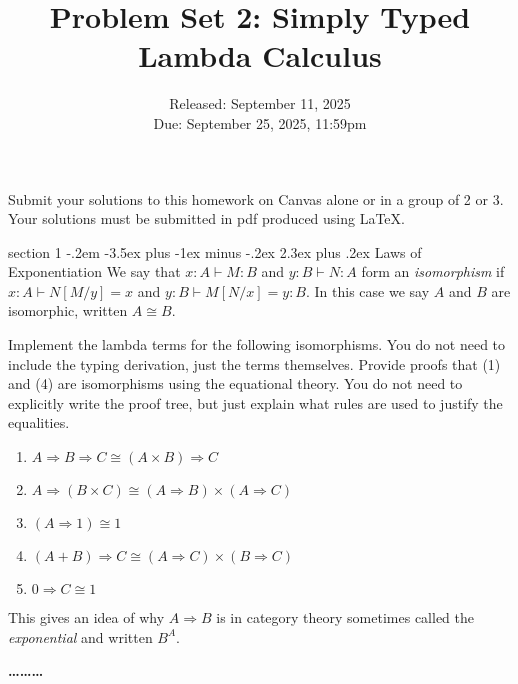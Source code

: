\documentclass[12pt]{article}
\makeatletter
\newenvironment{problem}{\@startsection
       {section}
       {1}
       {-.2em}
       {-3.5ex plus -1ex minus -.2ex}
       {2.3ex plus .2ex}
       {\pagebreak[3]%
       \large\bf\noindent{Problem }
       }
       }
       {%
       \begin{center}\large\bf \ldots\ldots\ldots\end{center}}
\makeatother
\begin{document}
\title{Problem Set 2: Simply Typed Lambda Calculus}
\date{Released: September 11, 2025\\
  Due: September 25, 2025, 11:59pm
}
\maketitle

Submit your solutions to this homework on Canvas alone or in a group of 2 or
3. Your solutions must be submitted in pdf produced using LaTeX.

\begin{problem}{Laws of Exponentiation}
  We say that $x:A \vdash M : B$ and $y: B \vdash N : A$ form an
  \emph{isomorphism} if $x:A \vdash N[M/y] = x$ and $y:B \vdash M[N/x]
  = y: B$. In this case we say $A$ and $B$ are isomorphic, written $A
  \cong B$.

  Implement the lambda terms for the following isomorphisms. You do
  not need to include the typing derivation, just the terms
  themselves. Provide proofs that (1) and (4) are isomorphisms using
  the equational theory. You do not need to explicitly write the proof
  tree, but just explain what rules are used to justify the
  equalities.
  \begin{enumerate}
  \item $A \Rightarrow B \Rightarrow C \cong (A \times B) \Rightarrow C$
  \item $A \Rightarrow (B \times C) \cong (A \Rightarrow B) \times (A \Rightarrow C)$
  \item $(A \Rightarrow 1) \cong 1$
  \item $(A + B) \Rightarrow C \cong (A \Rightarrow C) \times (B \Rightarrow C)$
  \item $0 \Rightarrow C \cong 1$
  \end{enumerate}
  This gives an idea of why $A \Rightarrow B$ is in category theory
  sometimes called the \emph{exponential} and written $B^A$.
\end{problem}
\end{document}
